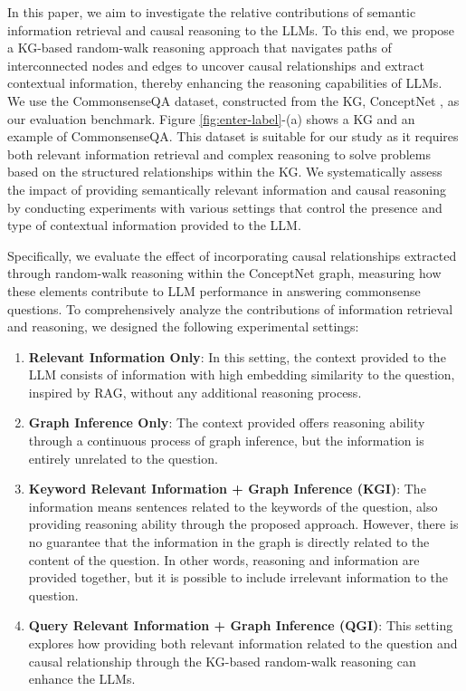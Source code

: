 \documentclass{article}
\begin{document}
In this paper, we aim to investigate the relative contributions of semantic information retrieval and causal reasoning to the LLMs. To  this end, we propose a KG-based random-walk reasoning approach that navigates paths of interconnected nodes and edges to uncover causal relationships and extract contextual information, thereby enhancing the reasoning capabilities of LLMs. We use the CommonsenseQA \citep{talmor2018commonsenseqa} dataset, constructed from the KG, ConceptNet \citep{speer2017conceptnet}, as our evaluation benchmark. Figure \ref{fig:enter-label}-(a) shows a KG and an example of CommonsenseQA. This dataset is suitable for our study as it requires both relevant information retrieval and complex reasoning to solve problems based on the structured relationships within the KG. We systematically assess the impact of providing semantically relevant information and causal reasoning by conducting experiments with various settings that control the presence and type of contextual information provided to the LLM.

Specifically, we evaluate the effect of incorporating causal relationships extracted through random-walk reasoning within the ConceptNet graph, measuring how these elements contribute to LLM performance in answering commonsense questions. To comprehensively analyze the contributions of information retrieval and reasoning, we designed the following experimental settings:
\begin{enumerate}
    \item \textbf{Relevant Information Only}: In this setting, the context provided to the LLM consists of information with high embedding similarity to the question, inspired by RAG, without any additional reasoning process.

    \item \textbf{Graph Inference Only}: The context provided offers reasoning ability through a continuous process of graph inference, but the information is entirely unrelated to the question.

    \item \textbf{Keyword Relevant Information + Graph Inference (KGI)}: The information means sentences related to the keywords of the question, also providing reasoning ability through the proposed approach. However, there is no guarantee that the information in the graph is directly related to the content of the question. In other words, reasoning and information are provided together, but it is possible to include irrelevant information to the question.

    \item \textbf{Query Relevant Information + Graph Inference (QGI)}: This setting explores how providing both relevant information related to the question and causal relationship through the KG-based random-walk reasoning can enhance the LLMs.
\end{enumerate}
\end{document}

